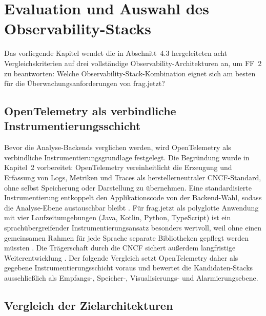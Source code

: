 

\chapter{Evaluation und Auswahl des Observability-Stacks}

Das vorliegende Kapitel wendet die in Abschnitt~4.3 hergeleiteten acht Vergleichskriterien auf drei vollständige Observability-Architekturen an, um FF~2 zu beantworten: Welche Observability-Stack-Kombination eignet sich am besten für die Überwachungsanforderungen von frag.jetzt?


\section{OpenTelemetry als verbindliche Instrumentierungsschicht}

Bevor die Analyse-Backends verglichen werden, wird OpenTelemetry als verbindliche Instrumentierungsgrundlage festgelegt. Die Begründung wurde in Kapitel~2 vorbereitet: OpenTelemetry vereinheitlicht die Erzeugung und Erfassung von Logs, Metriken und Traces als herstellerneutraler CNCF-Standard, ohne selbst Speicherung oder Darstellung zu übernehmen. Eine standardisierte Instrumentierung entkoppelt den Applikationscode von der Backend-Wahl, sodass die Analyse-Ebene austauschbar bleibt \parencite[S.~107]{sakinala2025observability}. Für frag.jetzt als polyglotte Anwendung mit vier Laufzeitumgebungen (Java, Kotlin, Python, TypeScript) ist ein sprachübergreifender Instrumentierungsansatz besonders wertvoll, weil ohne einen gemeinsamen Rahmen für jede Sprache separate Bibliotheken gepflegt werden müssten \parencite[S.~106]{sakinala2025observability}. Die Trägerschaft durch die CNCF sichert außerdem langfristige Weiterentwicklung \parencite[S.~107]{sakinala2025observability}. Der folgende Vergleich setzt OpenTelemetry daher als gegebene Instrumentierungsschicht voraus und bewertet die Kandidaten-Stacks ausschließlich als Empfangs-, Speicher-, Visualisierungs- und Alarmierungsebene.


\section{Vergleich der Zielarchitekturen}

